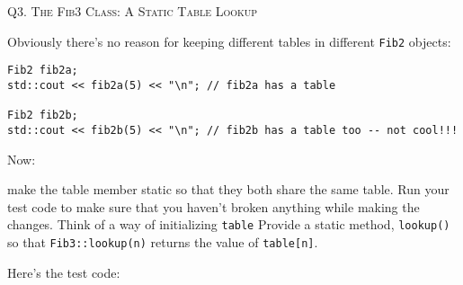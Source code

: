 Q3.
\textsc{The Fib3 Class: A Static Table Lookup}

Obviously there's no reason for keeping different tables in different \texttt{Fib2} objects:
\begin{Verbatim}[frame=single]
Fib2 fib2a;
std::cout << fib2a(5) << "\n"; // fib2a has a table

Fib2 fib2b;
std::cout << fib2b(5) << "\n"; // fib2b has a table too -- not cool!!!
\end{Verbatim}

Now:
\begin{tightlist}
  \li make the table member static so that they both share the same table. Run your test code to
  make sure that you haven't broken anything while making the changes. Think of a way of
  initializing \verb!table!
  \li Provide a static method, \texttt{lookup()} so that \texttt{Fib3::lookup(n)} returns the value of
  \verb!table[n]!.
\end{tightlist}

Here's the test code:
